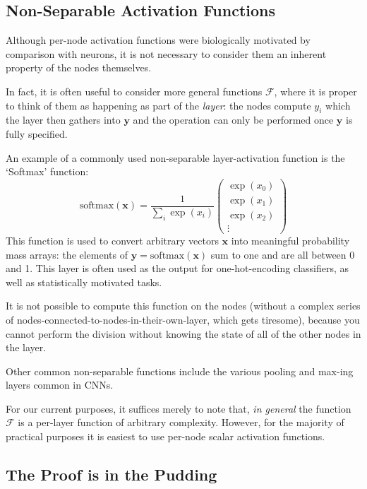 \documentclass[a4paper,openany,11pt]{book}
\renewcommand\vec[1]{\boldsymbol{\mathbf{#1}}}
\begin{document}
				\subsection{Non-Separable Activation Functions}

					Although per-node activation functions were biologically motivated by comparison with neurons, it is not necessary to consider them an inherent property of the nodes themselves. 

					In fact, it is often useful to consider more general functions $\mathcal{F}$, where it is proper to think of them as happening as part of the \textit{layer}: the nodes compute $y_i$ which the layer then gathers into $\vec{y}$ and the operation can only be performed once $\vec{y}$ is fully specified. 

					An example of a commonly used non-separable layer-activation function is the `Softmax' function:
					\begin{equation}
						\text{softmax}(\vec{x}) = \frac{1}{\sum_i \exp(x_i)} \begin{pmatrix}
							\exp(x_0) \\ \exp(x_1) \\ \exp(x_2) \\ \vdots
						\end{pmatrix}
					\end{equation}
					This function is used to convert arbitrary vectors $\vec{x}$ into meaningful probability mass arrays: the elements of $\vec{y} = \text{softmax}(\vec{x})$ sum to one and are all between 0 and 1. This layer is often used as the output for one-hot-encoding classifiers, as well as statistically motivated tasks. 

					It is not possible to compute this function on the nodes (without a complex series of nodes-connected-to-nodes-in-their-own-layer, which gets tiresome), because you cannot perform the division without knowing the state of all of the other nodes in the layer.

					Other common non-separable functions include the various pooling and max-ing layers common in CNNs. 

					For our current purposes, it suffices merely to note that, \textit{in general} the function $\mathcal{F}$ is a per-layer function of arbitrary complexity. However, for the majority of practical purposes it is easiest to use per-node scalar activation functions.

				\subsection{The Proof is in the Pudding}
\end{document}
